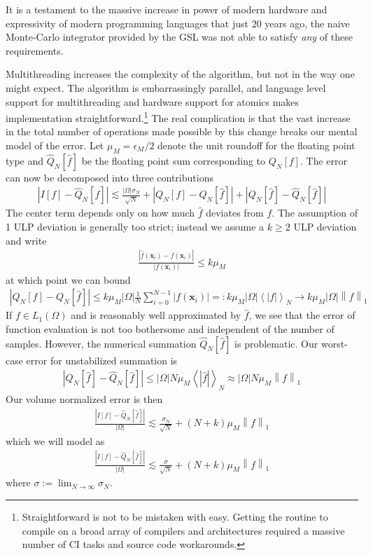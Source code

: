 \documentclass{ansarticle}
\begin{document}
It is a testament to the massive increase in power of modern hardware and expressivity of modern programming languages that just 20 years ago, the naive Monte-Carlo integrator provided by the GSL \citep{gough2009gnu} was not able to satisfy \emph{any} of these requirements.

Multithreading increases the complexity of the algorithm, but not in the way one might expect.
The algorithm is embarrassingly parallel, and language level support for multithreading and hardware support for atomics makes implementation straightforward.\footnote{Straightforward is not to be mistaken with easy. Getting the routine to compile on a broad array of compilers and architectures required a massive number of CI tasks and source code workarounds.}
The real complication is that the vast increase in the total number of operations made possible by this change breaks our mental model of the error.
Let $\mu_{M} = \epsilon_{M}/2$ denote the unit roundoff for the floating point type and $\hat{Q}_{N}[\hat{f}]$ be the floating point sum corresponding to $Q_{N}[f]$.
The error can now be decomposed into three contributions
\begin{align*}
| I[f] - \hat{Q}_{N}[\hat{f}] | \lesssim \frac{|\Omega|\sigma_{N}}{\sqrt{N}} + \left| Q_{N}[f] - Q_{N}[\hat{f}] \right| + \left| Q_{N}[\hat{f}] - \hat{Q}_{N}[\hat{f}] \right|
\end{align*}
The center term depends only on how much $\hat{f}$ deviates from $f$.
The assumption of 1 ULP deviation is generally too strict; instead we assume a $k \ge 2$ ULP deviation and write
 \begin{align*}
\frac{|\hat{f}(\mathbf{x}_{i}) - f(\mathbf{x}_{i})|}{|f(\mathbf{x}_{i})|} \le k\mu_{M}
 \end{align*}
at which point we can bound
\begin{align*}
\left| Q_{N}[f] - Q_{N}[\hat{f}] \right|  \le k\mu_{M} |\Omega| \frac{1}{N} \sum_{i=0}^{N-1} |f(\mathbf{x}_{i})| =: k\mu_{M}|\Omega| \left< |f| \right>_{N} \to k\mu_{M}|\Omega| \left\|f\right\|_{1}
\end{align*}
If $f \in L_{1}(\Omega)$ and is reasonably well approximated by $\hat{f}$, we see that the error of function evaluation is not too bothersome and independent of the number of samples.
However, the numerical summation $\hat{Q}_{N}[\hat{f}]$ is problematic.
Our worst-case error for unstabilized summation is \citep{higham1993accuracy}
\begin{align*}
 \left| Q_{N}[\hat{f}] - \hat{Q}_{N}[\hat{f}] \right| \le |\Omega| N\mu_{M} \left<|\hat{f}| \right>_{N} \approx  |\Omega| N\mu_{M} \left\|f\right\|_{1}
\end{align*}
Our volume normalized error is then
\begin{align*}
\frac{| I[f] - \hat{Q}_{N}[\hat{f}] | }{|\Omega|} \lesssim \frac{\sigma_{N}}{\sqrt{N}}  + (N+k)\mu_{M} \left\|f\right\|_{1}
\end{align*}
which we will model as
\begin{align}\label{ErrorModel}
\frac{| I[f] - \hat{Q}_{N}[\hat{f}] | }{|\Omega|} \lesssim \frac{\sigma}{\sqrt{N}}  + (N+k)\mu_{M} \left\|f\right\|_{1}
\end{align}
where $\sigma := \lim_{N\to \infty} \sigma_{N}$.
\end{document}

